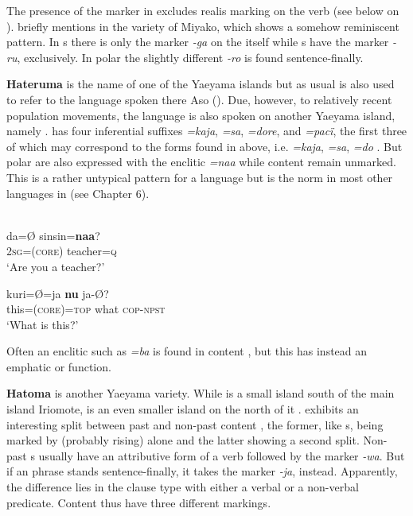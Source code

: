 \noindent The presence of the  marker in  excludes realis marking on the verb (see below on \textit{}). \citet[396]{Lawrence2012} briefly mentions  in the \textbf{} variety of Miyako, which shows a somehow reminiscent pattern. In s there is only the marker \textit{-ga} on the  itself while s have the  marker \textit{-ru}, exclusively. In polar  the slightly different \textit{-ro} is found sentence-finally.

\textbf{Hateruma} is the name of one of the Yaeyama islands but as usual is also used to refer to the language spoken there Aso (\citeyear*{Aso2010,Aso2015}). Due, however, to relatively recent population movements, the language is also spoken on another Yaeyama island, namely .  has four inferential suffixes \textit{=kaja}, \textit{=sa}, \textit{=dore}, and \textit{=pacï}, the first three of which may correspond to the forms found in  above, i.e. \textit{=kaja}, \textit{=sa}, \textit{=do} \citep[208]{Aso2010}. But polar  are also expressed with the enclitic \textit{=naa} while content  remain unmarked. This is a rather untypical pattern for a  language but is the norm in most other languages in  (see Chapter 6).

\ea%
    \label{ex:japa:45}
    \\
    \ea
    \gll da=Ø    sinsin=\textbf{{naa}}?\\
    2\textsc{sg}=(\textsc{core})  teacher=\textsc{q}\\
    \glt ‘Are you a teacher?’
    
    \ex
    \gll kuri=Ø=ja \textbf{{nu}} ja-Ø?\\
    this=(\textsc{core})=\textsc{top}  what  \textsc{cop}-\textsc{npst}\\
    \glt ‘What is this?’ \citep[210]{Aso2010}
    \z
    \z

\noindent Often an enclitic such as \textit{=ba} is found in content , but this has instead an emphatic or  function.

\textbf{Hatoma} is another Yaeyama variety. While  is a small island south of the main island Iriomote,  is an even smaller island on the north of it \citep[189]{Aso2010}.  exhibits an interesting split between past and non-past content  \citep[396]{Lawrence2012}, the former, like s, being marked by (probably rising)  alone and the latter showing a second split. Non-past s usually have an attributive form of a verb followed by the marker \textit{-wa}. But if an  phrase stands sentence-finally, it takes the marker \textit{-ja}, instead. Apparently, the difference lies in the clause type with either a verbal or a non-verbal predicate. Content  thus have three different markings.


